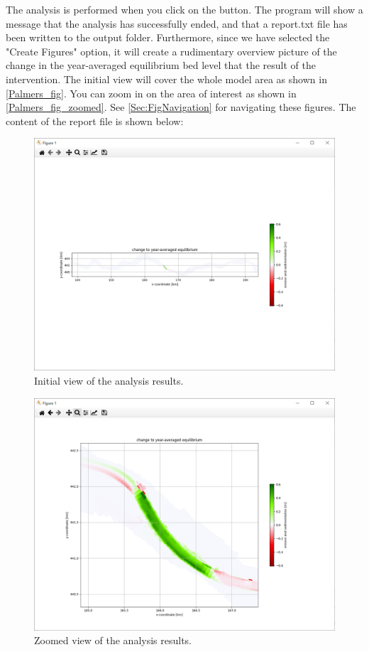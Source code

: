 The \dfmi analysis is performed when you click on the  button.
The program will show a message that the analysis has successfully ended, and that a report.txt file has been written to the output folder.
Furthermore, since we have selected the "Create Figures" option, it will create a rudimentary overview picture of the change in the year-averaged equilibrium bed level that the result of the intervention.
The initial view will cover the whole model area as shown in \autoref{Palmers_fig}.
You can zoom in on the area of interest as shown in \autoref{Palmers_fig_zoomed}.
See \autoref{Sec:FigNavigation} for navigating these figures.
The content of the report file is shown below:

\begin{figure}
\center
\includegraphics[width=\textwidth]{figures/Palmerswaard_fig.png}
\caption{Initial view of the analysis results.}
\label{Palmers_fig}
\end{figure}

\begin{figure}
\center
\includegraphics[width=\textwidth]{figures/Palmerswaard_fig_zoomed.png}
\caption{Zoomed view of the analysis results.}
\label{Palmers_fig_zoomed}
\end{figure}

